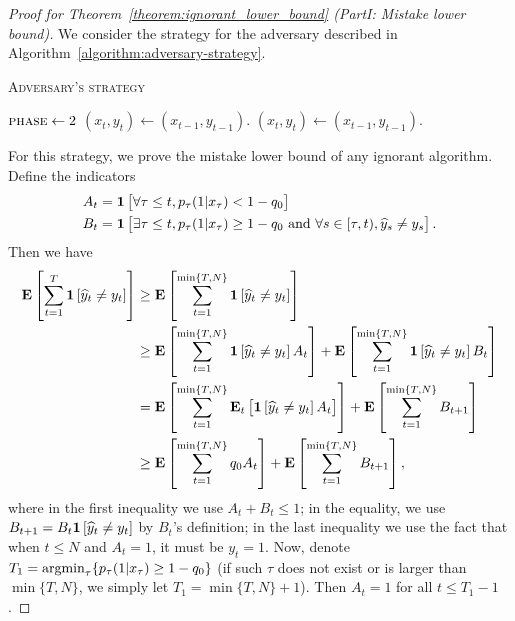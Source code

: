 \begin{proof}[Proof for Theorem~\ref{theorem:ignorant_lower_bound} (PartI: Mistake lower bound)]
We consider the strategy for the adversary described in Algorithm~\ref{algorithm:adversary-strategy}. 
\begin{algorithm}[h]
\caption{\textsc{Adversary's strategy}}
\label{algorithm:adversary-strategy}
\begin{algorithmic}[1]
{
       \ELSE
          \STATE $\textsc{phase}\leftarrow 2$
       \ENDIF
       \STATE $(x_t, y_t)\leftarrow (x_{t-1}, y_{t-1})$. 
    \ENDIF
\ENDFOR
{}
    \STATE $(x_t, y_t)\leftarrow (x_{t-1}, y_{t-1})$. 
\ENDFOR


}
\end{algorithmic}
\end{algorithm}
For this strategy, we prove the mistake lower bound of any ignorant algorithm. 
Define the indicators 
\begin{align*}
A_t &= \mathbf{1}\left[\forall \tau\leq t, p_\tau(1|x_\tau)<1-q_0 \right] \\
B_t &= \mathbf{1}\left[\exists \tau\leq t, p_\tau(1|x_\tau)\geq 1-q_0
 \text{\ and\ } \forall s\in[\tau,t), \widehat y_s \neq y_s \right]. 
\end{align*}
Then we have 
\begin{align}
    \mathbf{E}\left[\sum_{t=1}^{T} \mathbf{1}\left[\widehat y_t\neq y_t \right]\right] 
    &\geq \mathbf{E}\left[\sum_{t=1}^{\min\{T,N\}} \mathbf{1}\left[\widehat y_t\neq y_t \right]\right] \nonumber \\
    & \geq \mathbf{E}\left[\sum_{t=1}^{\min\{T,N\}} \mathbf{1}\left[\widehat y_t\neq y_t \right]A_t\right] + \mathbf{E}\left[\sum_{t=1}^{\min\{T,N\}} \mathbf{1}\left[\widehat y_t\neq y_t \right]B_t\right] \nonumber \\
    & = \mathbf{E}\left[\sum_{t=1}^{\min\{T,N\}} \mathbf{E}_t\left[\mathbf{1}\left[\widehat y_t\neq y_t \right]A_t\right]\right] + \mathbf{E}\left[\sum_{t=1}^{\min\{T,N\}} B_{t+1}\right] \nonumber \\
    & \geq \mathbf{E}\left[\sum_{t=1}^{\min\{T,N\}} q_0 A_t\right] + \mathbf{E}\left[\sum_{t=1}^{\min\{T,N\}} B_{t+1}\right], 
    \label{eqn:mistake_lower_bound_temp}
\end{align}
where in the first inequality we use $A_t+B_t\leq 1$; 
in the equality, we use  $B_{t+1}=B_t\mathbf{1}\left[\widehat y_t\neq y_t \right]$ by $B_t$'s definition; 
in the last inequality we use the fact that when $t\leq N$ and $A_t=1$, it must be $y_t=1$. 
Now, denote $T_1 = \operatorname*{argmin}_{\tau} \{ p_\tau(1|x_\tau) \geq 1-q_0 \}$ (if such $\tau$ does not exist or is larger than $\min\{T,N\}$, we simply let $T_1=\min\{T,N\}+1$). 
Then $A_t=1$ for all $t\leq T_1-1$. 


\end{proof}
